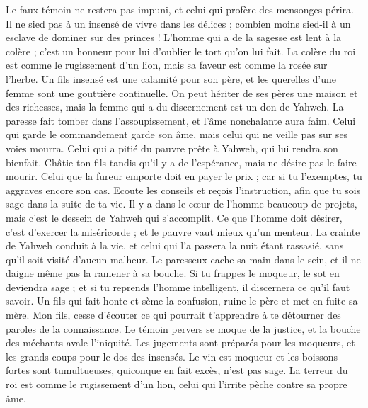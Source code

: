 \begin{multicols}{2}
Le faux témoin ne restera pas impuni, et celui qui profère des mensonges périra.
Il ne sied pas à un insensé de vivre dans les délices ; combien moins sied-il à un esclave de dominer sur des princes !
L'homme qui a de la sagesse est lent à la colère ; c'est un honneur pour lui d’oublier le tort qu'on lui fait.
La colère du roi est comme le rugissement d'un lion, mais sa faveur est comme la rosée sur l'herbe.
Un fils insensé est une calamité pour son père, et les querelles d’une femme sont une gouttière continuelle.
On peut hériter de ses pères une maison et des richesses, mais la femme qui a du discernement est un don de Yahweh.
La paresse fait tomber dans l’assoupissement, et l'âme nonchalante aura faim.
Celui qui garde le commandement garde son âme, mais celui qui ne veille pas sur ses voies mourra.
Celui qui a pitié du pauvre prête à Yahweh, qui lui rendra son bienfait.
Châtie ton fils tandis qu'il y a de l'espérance, mais ne désire pas le faire mourir.
Celui que la fureur emporte doit en payer le prix ; car si tu l'exemptes, tu aggraves encore son cas.
Ecoute les conseils et reçois l'instruction, afin que tu sois sage dans la suite de ta vie.
Il y a dans le cœur de l’homme beaucoup de projets, mais c’est le dessein de Yahweh qui s’accomplit.
Ce que l'homme doit désirer, c'est d'exercer la miséricorde ; et le pauvre vaut mieux qu’un menteur.
La crainte de Yahweh conduit à la vie, et celui qui l'a passera la nuit étant rassasié, sans qu'il soit visité d'aucun malheur.
Le paresseux cache sa main dans le sein, et il ne daigne même pas la ramener à sa bouche.
Si tu frappes le moqueur, le sot en deviendra sage ; et si tu reprends l'homme intelligent, il discernera ce qu'il faut savoir.
Un fils qui fait honte et sème la confusion, ruine le père et met en fuite sa mère.
Mon fils, cesse d’écouter ce qui pourrait t’apprendre à te détourner des paroles de la connaissance.
Le témoin pervers se moque de la justice, et la bouche des méchants avale l'iniquité.
Les jugements sont préparés pour les moqueurs, et les grands coups pour le dos des insensés.
\VerseOne{}Le vin est moqueur et les boissons fortes sont tumultueuses, quiconque en fait excès, n'est pas sage.
La terreur du roi est comme le rugissement d'un lion, celui qui l’irrite pèche contre sa propre âme.

\end{multicols}

